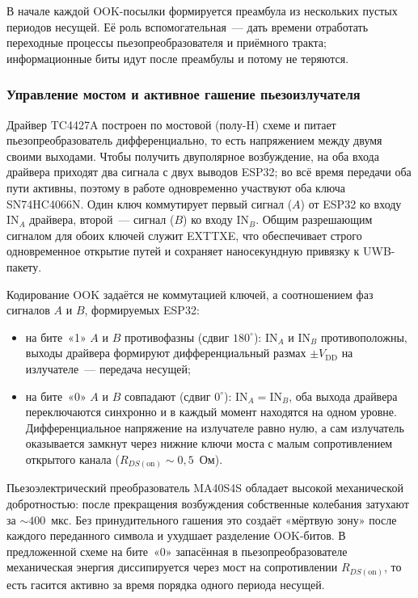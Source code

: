 \documentclass[a4paper,11pt]{article} %
\begin{document}
В начале каждой OOK-посылки формируется преамбула из нескольких пустых периодов несущей.
Её роль вспомогательная~--- дать времени отработать переходные процессы пьезопреобразователя
и приёмного тракта; информационные биты идут после преамбулы и потому не теряются.

\subsubsection{Управление мостом и активное гашение пьезоизлучателя}

Драйвер TC4427A построен по мостовой (полу-H) схеме и питает пьезопреобразователь
дифференциально, то есть напряжением между двумя своими выходами. Чтобы получить
двуполярное возбуждение, на оба входа драйвера приходят два сигнала с двух выводов
ESP32; во всё время передачи оба пути активны, поэтому в работе одновременно участвуют
оба ключа SN74HC4066N. Один ключ коммутирует первый сигнал ($A$) от ESP32 ко входу
$\text{IN}_A$ драйвера, второй~--- сигнал ($B$) ко входу $\text{IN}_B$. Общим
разрешающим сигналом для обоих ключей служит EXTTXE, что обеспечивает строго
одновременное открытие путей и сохраняет наносекундную привязку к UWB-пакету.

Кодирование OOK задаётся не коммутацией ключей, а соотношением фаз сигналов $A$ и $B$,
формируемых ESP32:
\begin{itemize}
    \item на бите~«1» $A$ и $B$ противофазны (сдвиг $180^\circ$): $\text{IN}_A$ и $\text{IN}_B$
          противоположны, выходы драйвера формируют дифференциальный размах
          ${\pm}V_\text{DD}$ на излучателе~--- передача несущей;
    \item на бите~«0» $A$ и $B$ совпадают (сдвиг $0^\circ$): $\text{IN}_A = \text{IN}_B$,
          оба выхода драйвера переключаются синхронно и в каждый момент находятся
          на одном уровне. Дифференциальное напряжение на излучателе равно нулю,
          а сам излучатель оказывается замкнут через нижние ключи моста с малым
          сопротивлением открытого канала ($R_{DS(\text{on})} \sim 0{,}5$~Ом).
\end{itemize}

Пьезоэлектрический преобразователь MA40S4S обладает высокой механической добротностью:
после прекращения возбуждения собственные колебания затухают за ${\sim}400$~мкс.
Без принудительного гашения это создаёт «мёртвую зону» после каждого переданного символа
и ухудшает разделение OOK-битов. В предложенной схеме на бите~«0» запасённая
в пьезопреобразователе механическая энергия диссипируется через мост на сопротивлении
$R_{DS(\text{on})}$, то есть гасится активно за время порядка одного периода несущей.
\end{document}
